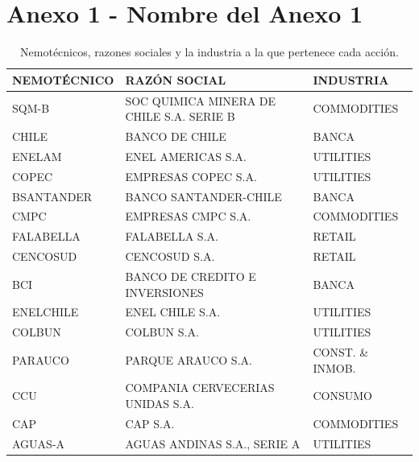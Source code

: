 \documentclass[12pt,letter,spanish]{article}
\begin{document}
\section*{\centering Anexo 1 - Nombre del Anexo 1}
\begin{table}[H]
\renewcommand\thetable{A1.1} 
\small
\caption{Nemotécnicos, razones sociales y la industria a la que pertenece cada acción. }
\begin{tabular}{|l|l|l|}
\hline
\textbf{NEMOTÉCNICO} & \textbf{RAZÓN SOCIAL}                      & \textbf{INDUSTRIA} \\ \hline
SQM-B                & SOC QUIMICA   MINERA DE CHILE S.A. SERIE B & COMMODITIES        \\ \hline
CHILE                & BANCO DE CHILE                             & BANCA              \\ \hline
ENELAM               & ENEL AMERICAS   S.A.                       & UTILITIES          \\ \hline
COPEC                & EMPRESAS COPEC   S.A.                      & UTILITIES          \\ \hline
BSANTANDER           & BANCO   SANTANDER-CHILE                    & BANCA              \\ \hline
CMPC                 & EMPRESAS CMPC   S.A.                       & COMMODITIES        \\ \hline
FALABELLA            & FALABELLA S.A.                             & RETAIL             \\ \hline
CENCOSUD             & CENCOSUD S.A.                              & RETAIL             \\ \hline
BCI                  & BANCO DE CREDITO   E INVERSIONES           & BANCA              \\ \hline
ENELCHILE            & ENEL CHILE S.A.                            & UTILITIES          \\ \hline
COLBUN               & COLBUN S.A.                                & UTILITIES          \\ \hline
PARAUCO              & PARQUE ARAUCO   S.A.                       & CONST. \& INMOB.   \\ \hline
CCU                  & COMPANIA   CERVECERIAS UNIDAS S.A.         & CONSUMO            \\ \hline
CAP                  & CAP S.A.                                   & COMMODITIES        \\ \hline
AGUAS-A              & AGUAS ANDINAS   S.A., SERIE A              & UTILITIES          \\ \hline

\end{tabular}
\end{table}
\end{document}
